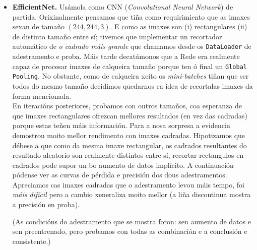 \documentclass{article}
\begin{document}
\begin{itemize}
	\item  \textbf{EfficientNet.} \cite{tan2019efficientnet} Usámola como CNN (\emph{Convolutional Neural Network}) de partida. Orixinalmente pensamos que tiña como requirimiento que as imaxes sexan de tamaño $(244,244,3)$. E como as imaxes son (i) rectangulares (ii) de distinto tamaño entre sí; tivemos que implementar un recortador automático de \emph{o cadrado máis grande} que chamamos desde os \texttt{DataLoader} de adestramento e proba. Máis tarde decatámonos que a Rede era realmente capaz de procesar imaxes de calqueira tamaño porque ten ó final un \texttt{Global Pooling}. No obstante, como de calqueira xeito os \emph{mini-batches} tiñan que ser todos do mesmo tamaño decidimos quedarnos ca idea de recortalas imaxes da forma mencionada. \\

En iteracións posteriores, probamos con outros tamaños, coa esperanza de que imaxes rectangulares ofrezcan mellores resultados (en vez das cadradas) porque estas teñen máis información. Para a nosa sorpresa a evidencia demostrou moito mellor rendimento con imaxes cadradas. Hipotizamos que débese a que como da mesma imaxe rectangular, os cadrados resultantes do resultado aleatorio son realmente distintos entre sí, recortar rectangulos en cadrados pode supor un bo aumento de datos implícito. A continuación pódense ver as curvas de pérdida e precisión dos dous adestramentos. Apreciamos cas imaxes cadradas que o adestramento levou máis tempo, foi \emph{máis difícil} pero a cambio xeneraliza moito mellor (a liña discontinua mostra a precisión en proba). 

(As condicións do adestramento que se mostra foron: sen aumento de datos e sen preentrenado, pero probamos con todas as combinación e a conclusión e consistente.)\\




\end{itemize}
\end{document}
